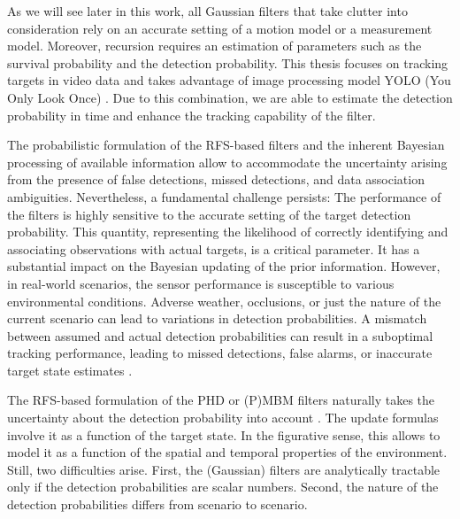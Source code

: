 As we will see later in this work, all Gaussian filters that take clutter into consideration rely on an accurate
setting
of a motion model or a measurement model. Moreover, recursion requires an estimation of parameters such as
the survival probability and the detection probability. This thesis focuses on tracking targets in video
data and takes advantage of image processing model YOLO (You Only Look Once) \cite{yanYolo2023}. Due to this combination, we are able to
estimate the detection probability in time and enhance the tracking capability of the filter.

The probabilistic formulation of the RFS-based filters and the inherent Bayesian processing of available information allow to accommodate the uncertainty arising from the presence of false detections, missed detections, and data association ambiguities. Nevertheless, a fundamental challenge persists: The performance of the filters is highly sensitive to the accurate setting of the target detection probability. This quantity, representing the likelihood of correctly identifying and associating observations with actual targets, is a critical parameter. It has a substantial impact on the Bayesian updating of the prior information.
However, in real-world scenarios, the sensor performance is susceptible to various environmental conditions. Adverse weather, occlusions, or just the nature of the current scenario can lead to variations in detection probabilities. A mismatch between assumed and actual detection probabilities can result in a suboptimal tracking performance, leading to missed detections, false alarms, or inaccurate target state estimates \cite{Hendeby2014Gaussian}.

The RFS-based formulation of the PHD or (P)MBM filters naturally takes the uncertainty about the detection
probability into account \cite{Hendeby2014Gaussian}. The update formulas involve it as a function of the target state. In the figurative sense, this allows to model it as a function of the spatial and temporal properties of the environment.
Still, two difficulties arise. First, the (Gaussian) filters are analytically tractable only if the detection probabilities are scalar numbers. Second, the nature of the detection probabilities differs from scenario to scenario.

